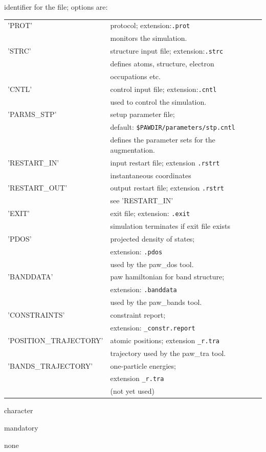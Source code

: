 \documentclass[final,12pt]{article}
\newcommand{\key}[1]{\hfill\break \makebox[1.5in][l]{\bf #1}\hfill\break}
\newcommand{\vdescr}[1]{\makebox[1in][l]{}\parbox[t]{110mm}{#1}\hfill\break}
\newcommand{\vformat}[1]{
\makebox[1in][l]{}\parbox[t]{110mm}{\makebox[1in][l]{Type:}\parbox[t]{2.7in}{#1}}
\hfill\break}
\newcommand{\vrules}[1]{
\makebox[1in][l]{}\parbox[t]{110mm}{\makebox[1in][l]{Rules:}\parbox[t]{2.7in}{#1}}
\hfill\break}
\newcommand{\vdefault}[1]{
\makebox[1in][l]{}\parbox[t]{110mm}
{\makebox[1in][l]{Default:}\parbox[t]{2.7in}{#1}}
\hfill\break}
\newcommand{\mbax}[1]{#1}
\begin{document}
\newpage
\mbax{\key{ID}
\vdescr{identifier for the file; options are:\hfill\break 
\noindent
\begin{tabular}{|l|l|}
\hline
'PROT'& protocol; extension:{\tt .prot}\\
&monitors the simulation.\\
\hline
'STRC'& structure input file; extension:{\tt .strc}\\
& defines atoms, structure, electron \\
&occupations etc.\\
\hline
'CNTL'& control input file; extension:{\tt .cntl}\\
&used to control the simulation.\\
\hline
'PARMS\_STP'& setup parameter file; \\
&default: {\tt \$PAWDIR/parameters/stp.cntl}\\
&defines the parameter sets for the augmentation.\\
\hline
'RESTART\_IN'& input restart file; extension {\tt .rstrt}\\
&instantaneous coordinates\\
\hline
'RESTART\_OUT'& output restart file; extension {\tt .rstrt}\\
&see 'RESTART\_IN'\\
\hline
'EXIT'& exit file; extension: {\tt .exit}\\
& simulation terminates if exit file exists\\
\hline
'PDOS'& projected density of states;\\
& extension: {\tt .pdos}\\
& used by the paw\_dos tool.\\
\hline
'BANDDATA'& paw hamiltonian for band structure;\\
& extension: {\tt .banddata}\\
& used by the paw\_bands tool.\\
\hline
'CONSTRAINTS'& constraint report;\\
& extension: {\tt \_constr.report}\\
\hline
'POSITION\_TRAJECTORY'& atomic positions; 
extension {\tt \_r.tra}\\
&trajectory used by the paw\_tra tool.\\
\hline
'BANDS\_TRAJECTORY'& one-particle energies;\\
&extension {\tt \_r.tra}\\
&(not yet used)\\
\hline
\end{tabular}
}
\vformat{character} 
\vrules{mandatory}
\vdefault{none}}
\end{document}

